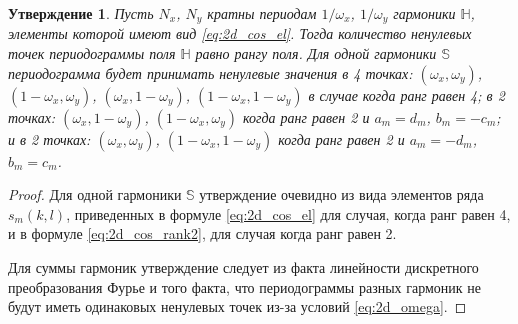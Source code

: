 \documentclass[specialist,
               substylefile = spbu.rtx,
               subf,href,colorlinks=true, 12pt]{disser}
\newtheorem{Th}{Утверждение}
\begin{document}
{{\begin{Th}
Пусть $N_x$, $N_y$ кратны периодам $1/\omega_x$, $1/\omega_y$ гармоники $\mathbb{H}$, элементы которой имеют вид \eqref{eq:2d_cos_el}.
Тогда количество ненулевых точек периодограммы поля $\mathbb{H}$ равно рангу поля. Для одной гармоники $\mathbb{S}$ периодограмма будет принимать ненулевые значения в 4 точках: $(\omega_x, \omega_y)$, $(1-\omega_x, \omega_y)$, $(\omega_x, 1-\omega_y)$, $(1-\omega_x, 1-\omega_y)$ в случае когда ранг равен 4; в 2 точках:  $(\omega_x, 1-\omega_y)$, $(1-\omega_x, \omega_y)$ когда ранг равен 2 и $a_m=d_m$, $b_m = -c_m$; и в 2 точках:  $(\omega_x, \omega_y)$, $(1-\omega_x, 1-\omega_y)$ когда ранг равен 2 и $a_m=-d_m$, $b_m = c_m$.
\end{Th}

\begin{proof}
Для одной гармоники $\mathbb{S}$ утверждение очевидно из вида элементов ряда $s_m(k,l)$, приведенных в формуле \eqref{eq:2d_cos_el} для случая, когда ранг равен 4, и в формуле \eqref{eq:2d_cos_rank2}, для случая когда ранг равен 2.

Для суммы гармоник утверждение следует из факта линейности дискретного преобразования Фурье и того факта, что периодограммы разных гармоник не будут иметь одинаковых ненулевых точек из-за условий \eqref{eq:2d_omega}.
\end{proof}

%
%

}}
\end{document}
